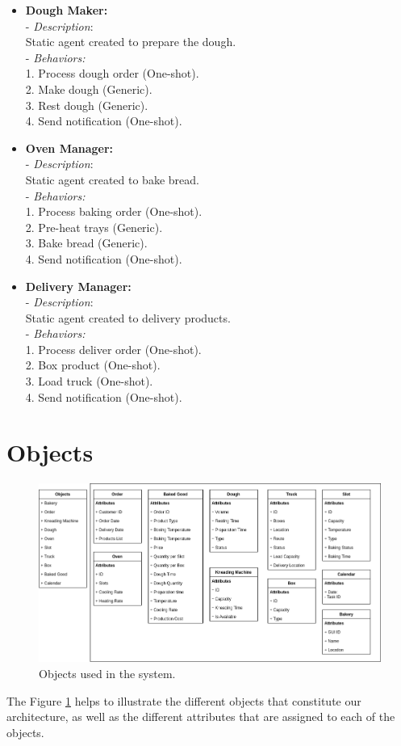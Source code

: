 \documentclass[a4paper]{article}
\begin{document}
\begin{itemize}
		 \item{\textbf{Dough Maker:} \\
		 	- \textit{Description}:\\
		 	Static agent created to prepare the dough. \\
		 	- \textit{Behaviors:} \\
		 	1. Process dough order (One-shot).\\
		 	2. Make dough (Generic).\\
		 	3. Rest dough (Generic).\\
		 	4. Send notification (One-shot).}
		 
		 \item{\textbf{Oven Manager:} \\
		 	- \textit{Description}:\\
		 	Static agent created to bake bread. \\
		 	- \textit{Behaviors:} \\
		 	1. Process baking order (One-shot).\\
		 	2. Pre-heat trays (Generic).\\
		 	3. Bake bread (Generic).\\
		 	4. Send notification (One-shot).}
		 
		 \item{\textbf{Delivery Manager:} \\
		 	- \textit{Description}:\\
		 	Static agent created to delivery products. \\
		 	- \textit{Behaviors:} \\
		 	1. Process deliver order (One-shot).\\
		 	2. Box product (One-shot).\\
		 	3. Load truck (One-shot).\\
		 	4. Send notification (One-shot).}
	 \end{itemize}
	 \newpage
	 \section{Objects}
	 
	 \begin{figure}[h!]
	 	\includegraphics[scale=0.4]{img/architecture-Objects.png}
	 	\caption{Objects used in the system.}
	 	\label{fig: ob}
	 \end{figure}
	
	The Figure \ref{fig: ob} helps to illustrate the different objects that constitute our architecture, as well as the different attributes that are assigned to each of the objects. 
\end{document}
